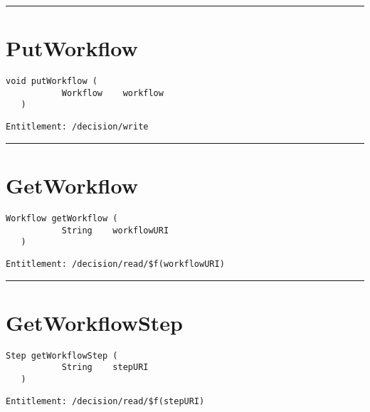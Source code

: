 \rule{12cm}{2pt}
\section{PutWorkflow}
\label{Api:PutWorkflow}
\begin{lstlisting}[style=nonumbers]
   void putWorkflow (
           Workflow    workflow
   )
\end{lstlisting}
\begin{Verbatim}[formatcom=\color{Maroon}]
  Entitlement: /decision/write
\end{Verbatim}



\rule{12cm}{2pt}
\section{GetWorkflow}
\label{Api:GetWorkflow}
\begin{lstlisting}[style=nonumbers]
   Workflow getWorkflow (
           String    workflowURI
   )
\end{lstlisting}
\begin{Verbatim}[formatcom=\color{Maroon}]
  Entitlement: /decision/read/$f(workflowURI)
\end{Verbatim}



\rule{12cm}{2pt}
\section{GetWorkflowStep}
\label{Api:GetWorkflowStep}
\begin{lstlisting}[style=nonumbers]
   Step getWorkflowStep (
           String    stepURI
   )
\end{lstlisting}
\begin{Verbatim}[formatcom=\color{Maroon}]
  Entitlement: /decision/read/$f(stepURI)
\end{Verbatim}



